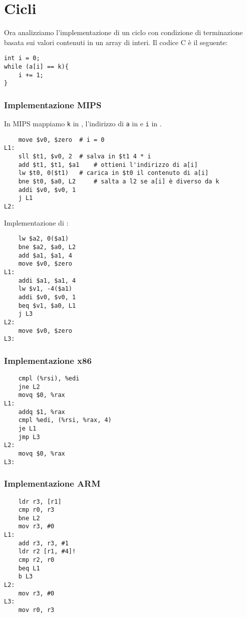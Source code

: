 \documentclass[class=book, crop=false, oneside]{standalone}
\begin{document}
\section{Cicli}
Ora analizziamo l'implementazione di un ciclo con condizione di terminazione basata sui valori contenuti in un array di interi. Il codice C è il seguente:
\begin{verbatim}
int i = 0;
while (a[i] == k){
	i += 1;
}
\end{verbatim}

\subsubsection{Implementazione MIPS}
In MIPS mappiamo \texttt{k} in , l'indirizzo di \texttt{a} in e \texttt{i} in .

\begin{verbatim}
	move $v0, $zero	 # i = 0
L1:
	sll $t1, $v0, 2	 # salva in $t1 4 * i
	add $t1, $t1, $a1	 # ottieni l'indirizzo di a[i]
	lw $t0, 0($t1)	 # carica in $t0 il contenuto di a[i]
	bne $t0, $a0, L2	 # salta a l2 se a[i] è diverso da k
	addi $v0, $v0, 1
	j L1
L2:
\end{verbatim}

Implementazione di :
\begin{verbatim}
	lw $a2, 0($a1)
	bne $a2, $a0, L2
	add $a1, $a1, 4
	move $v0, $zero
L1:
	addi $a1, $a1, 4
	lw $v1, -4($a1)
	addi $v0, $v0, 1
	beq $v1, $a0, L1
	j L3
L2:
	move $v0, $zero
L3:
\end{verbatim}

\subsubsection{Implementazione x86}
\begin{verbatim}
	cmpl (%rsi), %edi
	jne L2
	movq $0, %rax
L1:
	addq $1, %rax
	cmpl %edi, (%rsi, %rax, 4)
	je L1
	jmp L3
L2:
	movq $0, %rax
L3:
\end{verbatim}

\subsubsection{Implementazione ARM}
\begin{verbatim}
	ldr r3, [r1]
	cmp r0, r3
	bne L2
	mov r3, #0
L1:
	add r3, r3, #1
	ldr r2 [r1, #4]!
	cmp r2, r0
	beq L1
	b L3
L2:
	mov r3, #0
L3:
	mov r0, r3
\end{verbatim}
\end{document}
